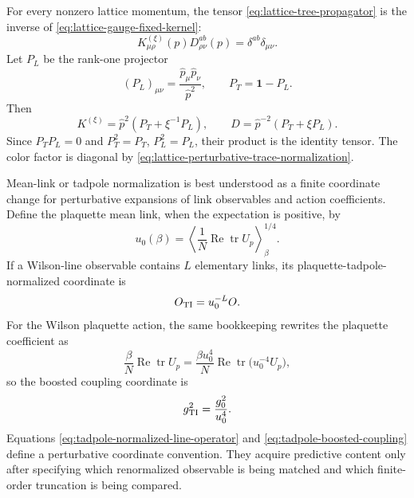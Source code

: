 \begin{remark}
\label{rem:lattice-tree-level-propagator}
For every nonzero lattice momentum, the tensor
\eqref{eq:lattice-tree-propagator} is the inverse of
\eqref{eq:lattice-gauge-fixed-kernel}:
\begin{equation}
  K_{\mu\rho}^{(\xi)}(p)D_{\rho\nu}^{ab}(p)
  =
  \delta^{ab}\delta_{\mu\nu}.
  \label{eq:lattice-propagator-inverse-identity}
\end{equation}
Let \(P_L\) be the rank-one projector
\[
  (P_L)_{\mu\nu}=\frac{\widehat p_\mu\widehat p_\nu}{\widehat p^2},
  \qquad
  P_T=\mathbf 1-P_L .
\]
Then
\[
  K^{(\xi)}=\widehat p^2(P_T+\xi^{-1}P_L),
  \qquad
  D=\widehat p^{-2}(P_T+\xi P_L).
  \]
Since \(P_TP_L=0\) and \(P_T^2=P_T\), \(P_L^2=P_L\), their product is the
identity tensor.  The color factor is diagonal by
\eqref{eq:lattice-perturbative-trace-normalization}.
\end{remark}

Mean-link or tadpole normalization is best understood as a finite coordinate
change for perturbative expansions of link observables and action
coefficients.  Define the plaquette mean link, when the expectation is
positive, by
\begin{equation}
  u_0(\beta)
  =
  \left\langle
    \frac1N\operatorname{Re}\operatorname{tr}U_p
  \right\rangle_\beta^{1/4}.
  \label{eq:plaquette-mean-link-definition}
\end{equation}
If a Wilson-line observable contains \(L\) elementary links, its
plaquette-tadpole-normalized coordinate is
\begin{equation}
  O_{\rm TI}=u_0^{-L}O .
  \label{eq:tadpole-normalized-line-operator}
\end{equation}
For the Wilson plaquette action, the same bookkeeping rewrites the plaquette
coefficient as
\[
  \frac{\beta}{N}\operatorname{Re}\operatorname{tr}U_p
  =
  \frac{\beta u_0^4}{N}
  \operatorname{Re}\operatorname{tr}\bigl(u_0^{-4}U_p\bigr),
  \]
so the boosted coupling coordinate is
\begin{equation}
  g_{\rm TI}^2=\frac{g_0^2}{u_0^4}.
  \label{eq:tadpole-boosted-coupling}
\end{equation}
Equations \eqref{eq:tadpole-normalized-line-operator} and
\eqref{eq:tadpole-boosted-coupling} define a perturbative coordinate
convention.  They acquire predictive content only after specifying which
renormalized observable is being matched and which finite-order truncation is
being compared.


